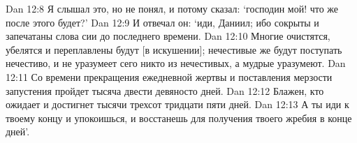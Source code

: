 Dan 12:8  Я слышал это, но не понял, и потому сказал: `господин мой! что же после этого будет?'
Dan 12:9  И отвечал он: `иди, Даниил; ибо сокрыты и запечатаны слова сии до последнего времени.
Dan 12:10  Многие очистятся, убелятся и переплавлены будут [в искушении]; нечестивые же будут поступать нечестиво, и не уразумеет сего никто из нечестивых, а мудрые уразумеют.
Dan 12:11  Со времени прекращения ежедневной жертвы и поставления мерзости запустения пройдет тысяча двести девяносто дней.
Dan 12:12  Блажен, кто ожидает и достигнет тысячи трехсот тридцати пяти дней.
Dan 12:13  А ты иди к твоему концу и упокоишься, и восстанешь для получения твоего жребия в конце дней'.


